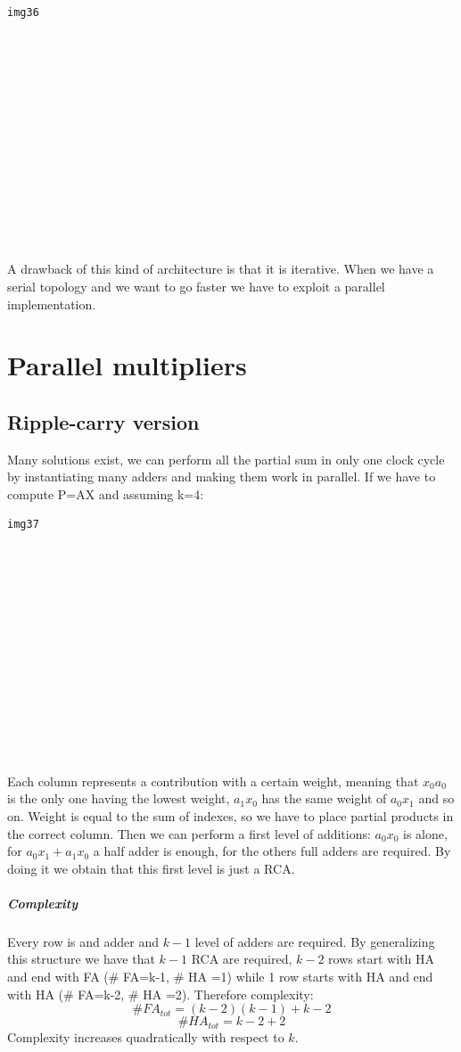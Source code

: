 \begin{verbatim}
img36














\end{verbatim}

A drawback of this kind of architecture is that it is iterative. When we have a serial topology and we want to go faster we have to exploit a parallel implementation.

\section{Parallel multipliers}

\subsection{Ripple-carry version}
Many solutions exist, we can perform all the partial sum in only one clock cycle by instantiating many adders and making them work in parallel. If we have to compute P=AX and assuming k=4:
\begin{verbatim}
img37














\end{verbatim}

Each column represents a contribution with a certain weight, meaning that $x_0a_0$ is the only one having the lowest weight, $a_1x_0$ has the same weight of $a_0x_1$ and so on. Weight is equal to the sum of indexes, so we have to place partial products in the correct column. Then we can perform a first level of additions: $a_0x_0$ is alone, for $a_0x_1+a_1x_0$ a half adder is enough, for the others full adders are required. By doing it we obtain that this first level is just a RCA.

\subparagraph{Complexity}
Every row is and adder and $k-1$ level of adders are required. By generalizing this structure we have that $k-1$ RCA are required, $k-2$ rows start with HA and end with FA (\# FA=k-1, \# HA =1) while 1 row starts with HA and end with HA (\# FA=k-2, \# HA =2). Therefore complexity:
$$  \#FA_{tot} = (k-2)(k-1)+k-2$$
$$  \#HA_{tot} = k-2+2$$
Complexity increases quadratically with respect to $k$.


